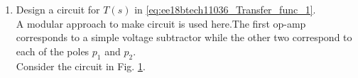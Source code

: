 \begin{enumerate}[label=\arabic*.,ref=\theenumi]
\item Design a circuit for $T(s)$ in \eqref{eq:ee18btech11036_Transfer_func_1}.
\\
\solution A modular approach to make circuit is used here.The first op-amp corresponds to a simple voltage subtractor while the other two correspond to each of the poles $p_1$ and $p_2$. \\Consider the circuit in 
Fig. \ref{fig:ee18btech11036_equivalent_control_system}.
\renewcommand{\thefigure}{\theenumi.\arabic{figure}}
\begin{figure}[!hbt]
	\begin{center}
			\resizebox{\columnwidth}{!}{}
	\end{center}
\caption{}
\label{fig:ee18btech11036_equivalent_control_system}
\end{figure}
%

\end{enumerate}
